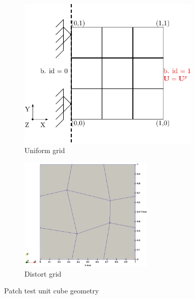 \documentclass[11pt,a4paper,final]{article}
\begin{document}
\begin{figure}[h]
\centering
\begin{subfigure}{0.4\textwidth}
\centering
\includegraphics[width=0.95\textwidth]{patch_test_grid.pdf}
\caption{Uniform grid}
\label{fig:1.1.1}
\end{subfigure}
\begin{subfigure}{0.4\textwidth}
\centering
\includegraphics[width=0.7\textwidth]{patch_distort_grid.png}
\caption{Distort grid}
\label{fig:1.1.2}
\end{subfigure}
\caption{Patch test unit cube geometry}
\label{fig:1.1}
\end{figure}
\end{document}
